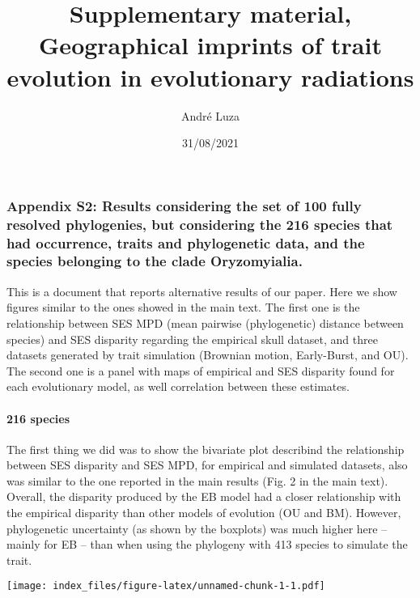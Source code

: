 \documentclass[
]{article}
\title{Supplementary material, Geographical imprints of trait evolution in
evolutionary radiations}
\author{André Luza}
\date{31/08/2021}
\begin{document}
\maketitle

\hypertarget{appendix-s2-results-considering-the-set-of-100-fully-resolved-phylogenies-but-considering-the-216-species-that-had-occurrence-traits-and-phylogenetic-data-and-the-species-belonging-to-the-clade-oryzomyialia.}{%
\subsubsection{Appendix S2: Results considering the set of 100 fully
resolved phylogenies, but considering the 216 species that had
occurrence, traits and phylogenetic data, and the species belonging to
the clade
Oryzomyialia.}\label{appendix-s2-results-considering-the-set-of-100-fully-resolved-phylogenies-but-considering-the-216-species-that-had-occurrence-traits-and-phylogenetic-data-and-the-species-belonging-to-the-clade-oryzomyialia.}}

This is a document that reports alternative results of our paper. Here
we show figures similar to the ones showed in the main text. The first
one is the relationship between SES MPD (mean pairwise (phylogenetic)
distance between species) and SES disparity regarding the empirical
skull dataset, and three datasets generated by trait simulation
(Brownian motion, Early-Burst, and OU). The second one is a panel with
maps of empirical and SES disparity found for each evolutionary model,
as well correlation between these estimates.

\hypertarget{species}{%
\paragraph{216 species}\label{species}}

The first thing we did was to show the bivariate plot describind the
relationship between SES disparity and SES MPD, for empirical and
simulated datasets, also was similar to the one reported in the main
results (Fig. 2 in the main text). Overall, the disparity produced by
the EB model had a closer relationship with the empirical disparity than
other models of evolution (OU and BM). However, phylogenetic uncertainty
(as shown by the boxplots) was much higher here --mainly for EB -- than
when using the phylogeny with 413 species to simulate the trait.

\texttt{[image: index\_files/figure-latex/unnamed-chunk-1-1.pdf]}
\end{document}
